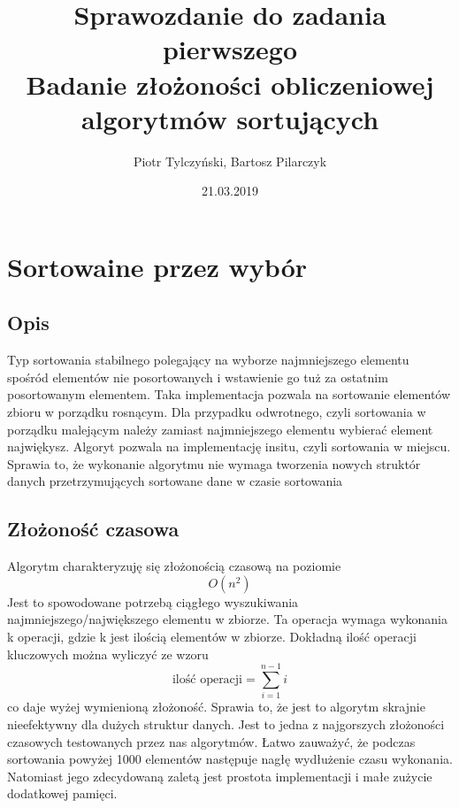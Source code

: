 \documentclass[]{article}
\title{
	{\large Sprawozdanie do zadania pierwszego}\\
	{\LARGE Badanie złożoności obliczeniowej algorytmów sortujących}}
\author{Piotr Tylczyński, Bartosz Pilarczyk}
\date{21.03.2019}
\begin{document}
\maketitle

\section{Sortowaine przez wybór}
	\subsection{Opis}
		Typ sortowania stabilnego polegający na wyborze najmniejszego elementu spośród elementów nie posortowanych i wstawienie go tuż za ostatnim posortowanym elementem. Taka implementacja pozwala na sortowanie elementów zbioru w porządku rosnącym. Dla przypadku odwrotnego, czyli sortowania w porządku malejącym należy zamiast najmniejszego elementu wybierać element najwiękysz. Algoryt pozwala na implementację insitu, czyli sortowania w miejscu. Sprawia to, że wykonanie algorytmu nie wymaga tworzenia nowych struktór danych przetrzymujących sortowane dane w czasie sortowania
	\subsection{Złożoność czasowa}
		Algorytm charakteryzuję się złożonością czasową na poziomie
		\[
			O(n^2)
		\]
		Jest to spowodowane potrzebą ciągłego wyszukiwania najmniejszego/największego elementu w zbiorze. Ta operacja wymaga wykonania k operacji, gdzie k jest ilością elementów  w zbiorze. Dokładną ilość operacji kluczowych można wyliczyć ze wzoru
		\[
			\text{ilość operacji} = \sum_{i = 1}^{n - 1}{i}
		\]
		co daje wyżej wymienioną złożoność.
		Sprawia to, że jest to algorytm skrajnie nieefektywny dla dużych struktur danych. Jest to jedna z najgorszych złożoności czasowych testowanych przez nas algorytmów. Łatwo zauważyć, że podczas sortowania powyżej 1000 elementów następuje nagłę wydłużenie czasu wykonania. Natomiast jego zdecydowaną zaletą jest prostota implementacji i małe zużycie dodatkowej pamięci.
		
	 	
\end{document}
